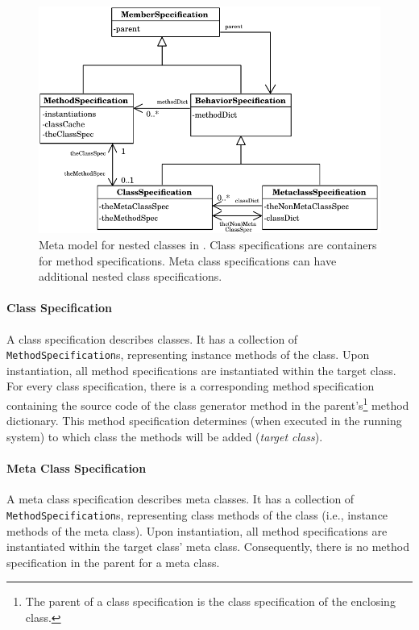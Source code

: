 \begin{figure}[!htp]
	\centering
	\includegraphics[scale=0.75]{metamodel.pdf}
	\caption[Meta model in \msname]{Meta model for nested classes in \msname. Class specifications are containers for method specifications. Meta class specifications can have additional nested class specifications.}
	\label{fig:impl_meta_model}
\end{figure}

\paragraph{Class Specification}
A class specification describes classes. It has a collection of \texttt{MethodSpecification}s, representing instance methods of the class. Upon instantiation, all method specifications are instantiated within the target class. For every class specification, there is a corresponding method specification containing the source code of the class generator method in the parent's\footnote{The parent of a class specification is the class specification of the enclosing class.} method dictionary. This method specification determines (when executed in the running system) to which class the methods will be added (\emph{target class}).

\paragraph{Meta Class Specification}
A meta class specification describes meta classes. It has a collection of \texttt{MethodSpecification}s, representing class methods of the class (i.e., instance methods of the meta class). Upon instantiation, all method specifications are instantiated within the target class' meta class. Consequently, there is no method specification in the parent for a meta class.

